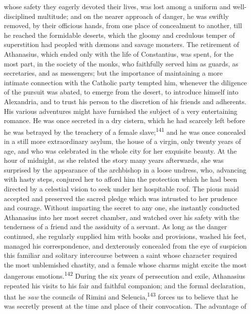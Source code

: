 whose safety they eagerly devoted their lives, was lost among a
uniform and well-disciplined multitude; and on the nearer
approach of danger, he was swiftly removed, by their officious
hands, from one place of concealment to another, till he reached
the formidable deserts, which the gloomy and credulous temper of
superstition had peopled with dæmons and savage monsters. The
retirement of Athanasius, which ended only with the life of
Constantius, was spent, for the most part, in the society of the
monks, who faithfully served him as guards, as secretaries, and
as messengers; but the importance of maintaining a more intimate
connection with the Catholic party tempted him, whenever the
diligence of the pursuit was abated, to emerge from the desert,
to introduce himself into Alexandria, and to trust his person to
the discretion of his friends and adherents. His various
adventures might have furnished the subject of a very
entertaining romance. He was once secreted in a dry cistern,
which he had scarcely left before he was betrayed by the
treachery of a female slave;\textsuperscript{141} and he was once concealed in a
still more extraordinary asylum, the house of a virgin, only
twenty years of age, and who was celebrated in the whole city for
her exquisite beauty. At the hour of midnight, as she related the
story many years afterwards, she was surprised by the appearance
of the archbishop in a loose undress, who, advancing with hasty
steps, conjured her to afford him the protection which he had
been directed by a celestial vision to seek under her hospitable
roof. The pious maid accepted and preserved the sacred pledge
which was intrusted to her prudence and courage. Without
imparting the secret to any one, she instantly conducted
Athanasius into her most secret chamber, and watched over his
safety with the tenderness of a friend and the assiduity of a
servant. As long as the danger continued, she regularly supplied
him with books and provisions, washed his feet, managed his
correspondence, and dexterously concealed from the eye of
suspicion this familiar and solitary intercourse between a saint
whose character required the most unblemished chastity, and a
female whose charms might excite the most dangerous emotions.\textsuperscript{142}
During the six years of persecution and exile, Athanasius
repeated his visits to his fair and faithful companion; and the
formal declaration, that he \textit{saw} the councils of Rimini and
Seleucia,\textsuperscript{143} forces us to believe that he was secretly present
at the time and place of their convocation. The advantage of
